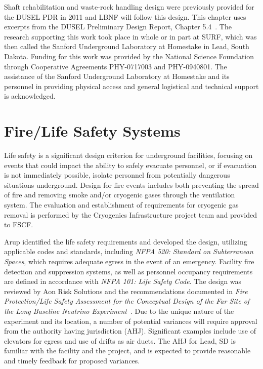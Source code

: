 Shaft rehabilitation and waste-rock handling design were previously provided for the DUSEL PDR in 2011 and LBNF will follow this design. This chapter uses excerpts from the DUSEL Preliminary Design Report, Chapter 5.4~\cite{dusel-pdr}. The research supporting this work took place in whole or in part at SURF, which was then called the Sanford Underground Laboratory at Homestake in Lead, South Dakota. Funding for this work was provided by the National Science Foundation through Cooperative Agreements PHY-0717003 and PHY-0940801. The assistance of the Sanford Underground Laboratory at Homestake and its personnel in providing physical access and general logistical and technical support is acknowledged.

\section{Fire/Life Safety Systems}
\label{sec:fscf-und-fire}

Life safety is a significant design criterion for underground facilities, focusing on events that could impact the ability to safely %
evacuate personnel, or if evacuation is not immediately possible, isolate personnel from potentially dangerous situations %
underground. Design for fire events includes both preventing the spread of fire and removing smoke and/or cryogenic gases through the ventilation system. The evaluation and establishment of requirements for cryogenic gas removal is performed by the Cryogenics Infrastructure project team and provided to FSCF.

Arup identified the life safety requirements and developed the design, utilizing applicable codes and standards, including \textit{NFPA 520: Standard on Subterranean Spaces}, which requires adequate egress in the event of an emergency. Facility fire detection and suppression systems, as well as personnel occupancy requirements are defined in accordance with \textit{NFPA 101: Life Safety Code}. The design was reviewed by Aon Risk Solutions and the recommendations documented in \textit{Fire Protection/Life Safety Assessment for the Conceptual Design of the Far Site of the Long Baseline Neutrino Experiment}~\cite{aon-risk-4395}. Due to the unique nature of the experiment and its location, a number of potential variances will require approval from the authority having jurisdiction (AHJ). Significant examples include use of elevators for egress and use of drifts as air ducts. The AHJ for Lead, SD is familiar with the facility and the project, and is expected to provide reasonable and timely feedback for proposed variances.  

